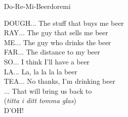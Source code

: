 \begin{song}{Do-Re-Mi-Beer}{doremi}
\begin{vers}
DOUGH... The stuff that buys me beer\\
RAY... The guy that sells me beer\\
ME... The guy who drinks the beer\\
FAR... The distance to my beer\\
SO... I think I'll have a beer\\
LA... La, la la la la beer\\
TEA... No thanks, I'm drinking beer\\
... That will bring us back to\\
(\textit{titta i ditt tomma glas})\\
D'OH!\\
\end{vers}
\end{song}

